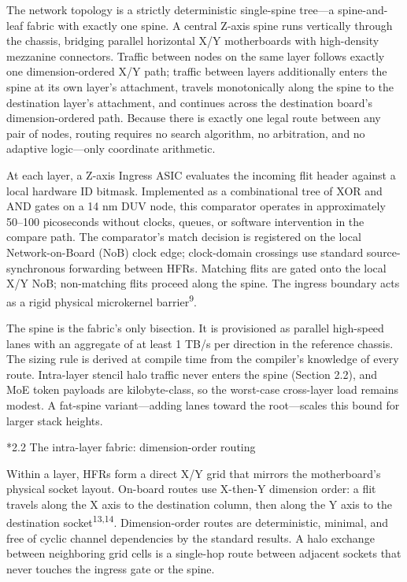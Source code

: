 \documentclass[12pt]{article}
\makeatletter
\renewcommand\subsection{\@startsection{subsection}{2}{\z@}{-1.0ex \@plus -0.2ex}{0.3ex}{\normalsize\bfseries}}
\makeatother
\begin{document}
The network topology is a strictly deterministic single-spine tree---a spine-and-leaf fabric with exactly one spine. A central Z-axis spine runs vertically through the chassis, bridging parallel horizontal X/Y motherboards with high-density mezzanine connectors. Traffic between nodes on the same layer follows exactly one dimension-ordered X/Y path; traffic between layers additionally enters the spine at its own layer's attachment, travels monotonically along the spine to the destination layer's attachment, and continues across the destination board's dimension-ordered path. Because there is exactly one legal route between any pair of nodes, routing requires no search algorithm, no arbitration, and no adaptive logic---only coordinate arithmetic.

At each layer, a Z-axis Ingress ASIC evaluates the incoming flit header against a local hardware ID bitmask. Implemented as a combinational tree of XOR and AND gates on a 14 nm DUV node, this comparator operates in approximately 50--100 picoseconds without clocks, queues, or software intervention in the compare path. The comparator's match decision is registered on the local Network-on-Board (NoB) clock edge; clock-domain crossings use standard source-synchronous forwarding between HFRs. Matching flits are gated onto the local X/Y NoB; non-matching flits proceed along the spine. The ingress boundary acts as a rigid physical microkernel barrier\textsuperscript{9}.

The spine is the fabric's only bisection. It is provisioned as parallel high-speed lanes with an aggregate of at least 1 TB/s per direction in the reference chassis. The sizing rule is derived at compile time from the compiler's knowledge of every route. Intra-layer stencil halo traffic never enters the spine (Section 2.2), and MoE token payloads are kilobyte-class, so the worst-case cross-layer load remains modest. A fat-spine variant---adding lanes toward the root---scales this bound for larger stack heights.

\subsection*{2.2 The intra-layer fabric: dimension-order routing}

Within a layer, HFRs form a direct X/Y grid that mirrors the motherboard's physical socket layout. On-board routes use X-then-Y dimension order: a flit travels along the X axis to the destination column, then along the Y axis to the destination socket\textsuperscript{13,14}. Dimension-order routes are deterministic, minimal, and free of cyclic channel dependencies by the standard results. A halo exchange between neighboring grid cells is a single-hop route between adjacent sockets that never touches the ingress gate or the spine.
\end{document}
